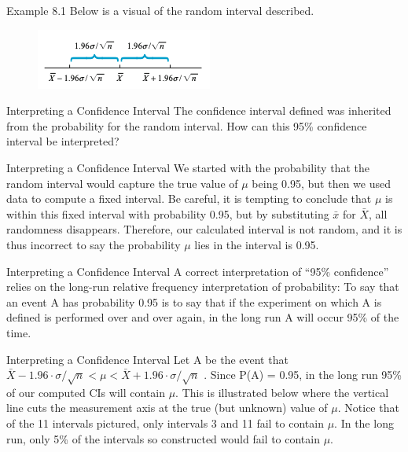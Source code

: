 \documentclass[
  ignorenonframetext,
]{beamer}
\begin{document}
\begin{frame}{Example 8.1}
\protect\hypertarget{example-8.1-5}{}
Below is a visual of the random interval described.

\begin{figure}

{\centering \includegraphics{images/randominterval.png}

}

\end{figure}
\end{frame}

\begin{frame}{Interpreting a Confidence Interval}
\protect\hypertarget{interpreting-a-confidence-interval}{}
The confidence interval defined was inherited from the probability for
the random interval. How can this 95\% confidence interval be
interpreted?
\end{frame}

\begin{frame}{Interpreting a Confidence Interval}
\protect\hypertarget{interpreting-a-confidence-interval-1}{}
We started with the probability that the random interval would capture
the true value of \(\mu\) being 0.95, but then we used data to compute a
fixed interval. Be careful, it is tempting to conclude that \(\mu\) is
within this fixed interval with probability 0.95, but by substituting
\(\bar{x}\) for \(\bar{X}\), all randomness disappears. Therefore, our
calculated interval is not random, and it is thus incorrect to say the
probability \(\mu\) lies in the interval is 0.95.
\end{frame}

\begin{frame}{Interpreting a Confidence Interval}
\protect\hypertarget{interpreting-a-confidence-interval-2}{}
A correct interpretation of ``95\% confidence'' relies on the long-run
relative frequency interpretation of probability: To say that an event A
has probability 0.95 is to say that if the experiment on which A is
defined is performed over and over again, in the long run A will occur
95\% of the time.
\end{frame}

\begin{frame}{Interpreting a Confidence Interval}
\protect\hypertarget{interpreting-a-confidence-interval-3}{}
Let A be the event that
\(\bar{X} - 1.96\cdot \sigma/\sqrt{n} < \mu < \bar{X} + 1.96\cdot \sigma/\sqrt{n}\)
. Since P(A) = 0.95, in the long run 95\% of our computed CIs will
contain \(\mu\). This is illustrated below where the vertical line cuts
the measurement axis at the true (but unknown) value of \(\mu\). Notice
that of the 11 intervals pictured, only intervals 3 and 11 fail to
contain \(\mu\). In the long run, only 5\% of the intervals so
constructed would fail to contain \(\mu\).
\end{frame}
\end{document}
